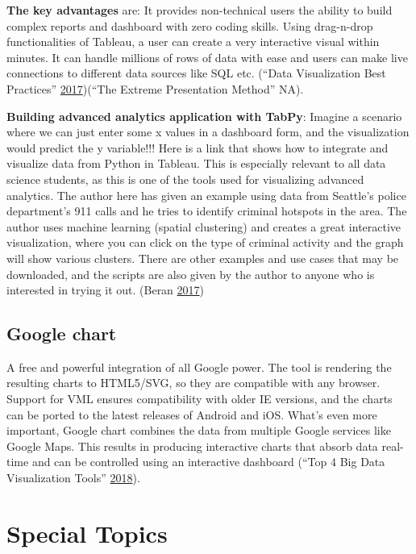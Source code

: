 \documentclass[]{book}
\begin{document}
\textbf{The key advantages} are: It provides non-technical users the
ability to build complex reports and dashboard with zero coding skills.
Using drag-n-drop functionalities of Tableau, a user can create a very
interactive visual within minutes. It can handle millions of rows of
data with ease and users can make live connections to different data
sources like SQL etc. (``Data Visualization Best Practices''
\protect\hyperlink{ref-VizBP}{2017})(``The Extreme Presentation Method''
NA).

\textbf{Building advanced analytics application with TabPy}: Imagine a
scenario where we can just enter some x values in a dashboard form, and
the visualization would predict the y variable!!! Here is a link that
shows how to integrate and visualize data from Python in Tableau. This
is especially relevant to all data science students, as this is one of
the tools used for visualizing advanced analytics. The author here has
given an example using data from Seattle's police department's 911 calls
and he tries to identify criminal hotspots in the area. The author uses
machine learning (spatial clustering) and creates a great interactive
visualization, where you can click on the type of criminal activity and
the graph will show various clusters. There are other examples and use
cases that may be downloaded, and the scripts are also given by the
author to anyone who is interested in trying it out. (Beran
\protect\hyperlink{ref-TabPy}{2017})

\subsection{Google chart}\label{google-chart}

A free and powerful integration of all Google power. The tool is
rendering the resulting charts to HTML5/SVG, so they are compatible with
any browser. Support for VML ensures compatibility with older IE
versions, and the charts can be ported to the latest releases of Android
and iOS. What's even more important, Google chart combines the data from
multiple Google services like Google Maps. This results in producing
interactive charts that absorb data real-time and can be controlled
using an interactive dashboard (``Top 4 Big Data Visualization Tools''
\protect\hyperlink{ref-top4_viz_tools}{2018}).

\section{Special Topics}\label{special-topics}
\end{document}
